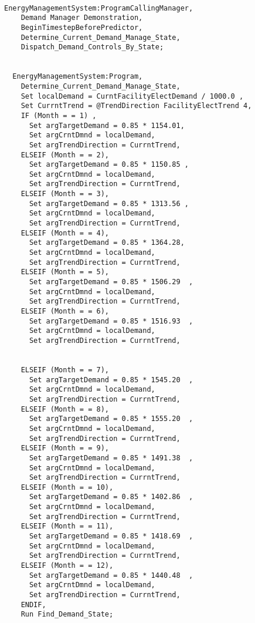 \begin{lstlisting}

EnergyManagementSystem:ProgramCallingManager,
    Demand Manager Demonstration,
    BeginTimestepBeforePredictor,
    Determine_Current_Demand_Manage_State,
    Dispatch_Demand_Controls_By_State;


  EnergyManagementSystem:Program,
    Determine_Current_Demand_Manage_State,
    Set localDemand = CurntFacilityElectDemand / 1000.0 ,
    Set CurrntTrend = @TrendDirection FacilityElectTrend 4,
    IF (Month = = 1) ,
      Set argTargetDemand = 0.85 * 1154.01,
      Set argCrntDmnd = localDemand,
      Set argTrendDirection = CurrntTrend,
    ELSEIF (Month = = 2),
      Set argTargetDemand = 0.85 * 1150.85 ,
      Set argCrntDmnd = localDemand,
      Set argTrendDirection = CurrntTrend,
    ELSEIF (Month = = 3),
      Set argTargetDemand = 0.85 * 1313.56 ,
      Set argCrntDmnd = localDemand,
      Set argTrendDirection = CurrntTrend,
    ELSEIF (Month = = 4),
      Set argTargetDemand = 0.85 * 1364.28,
      Set argCrntDmnd = localDemand,
      Set argTrendDirection = CurrntTrend,
    ELSEIF (Month = = 5),
      Set argTargetDemand = 0.85 * 1506.29  ,
      Set argCrntDmnd = localDemand,
      Set argTrendDirection = CurrntTrend,
    ELSEIF (Month = = 6),
      Set argTargetDemand = 0.85 * 1516.93  ,
      Set argCrntDmnd = localDemand,
      Set argTrendDirection = CurrntTrend,


    ELSEIF (Month = = 7),
      Set argTargetDemand = 0.85 * 1545.20  ,
      Set argCrntDmnd = localDemand,
      Set argTrendDirection = CurrntTrend,
    ELSEIF (Month = = 8),
      Set argTargetDemand = 0.85 * 1555.20  ,
      Set argCrntDmnd = localDemand,
      Set argTrendDirection = CurrntTrend,
    ELSEIF (Month = = 9),
      Set argTargetDemand = 0.85 * 1491.38  ,
      Set argCrntDmnd = localDemand,
      Set argTrendDirection = CurrntTrend,
    ELSEIF (Month = = 10),
      Set argTargetDemand = 0.85 * 1402.86  ,
      Set argCrntDmnd = localDemand,
      Set argTrendDirection = CurrntTrend,
    ELSEIF (Month = = 11),
      Set argTargetDemand = 0.85 * 1418.69  ,
      Set argCrntDmnd = localDemand,
      Set argTrendDirection = CurrntTrend,
    ELSEIF (Month = = 12),
      Set argTargetDemand = 0.85 * 1440.48  ,
      Set argCrntDmnd = localDemand,
      Set argTrendDirection = CurrntTrend,
    ENDIF,
    Run Find_Demand_State;





\end{lstlisting}
